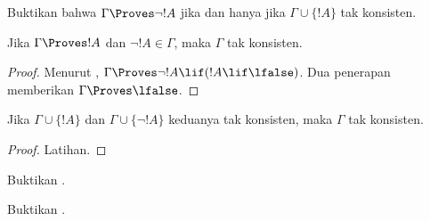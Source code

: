 \documentclass[../../../include/open-logic-section]{subfiles}
\begin{document}
\begin{prob}
Buktikan bahwa $\Gamma \Proves \lnot !A$ jika dan hanya jika
$\Gamma \cup \{!A\}$ tak konsisten.
\end{prob}

\begin{prop}
  Jika $\Gamma \Proves !A$ dan $\lnot !A \in \Gamma$, maka $\Gamma$
  tak konsisten.
\end{prop}

\begin{proof}
  Menurut ,
  $\Gamma \Proves \lnot !A \lif (!A \lif \lfalse)$.
  Dua penerapan  memberikan
  $\Gamma \Proves \lfalse$.
\end{proof}

\begin{prop}
  Jika $\Gamma \cup \{!A\}$ dan $\Gamma \cup \{\lnot !A\}$ keduanya
  tak konsisten, maka $\Gamma$ tak konsisten.
\end{prop}

\begin{proof}
Latihan.
\end{proof}

\begin{prob}
  Buktikan .
\end{prob}
\tagendprob

\begin{prob}
  Buktikan .
\end{prob}
\tagendprob
\end{document}
